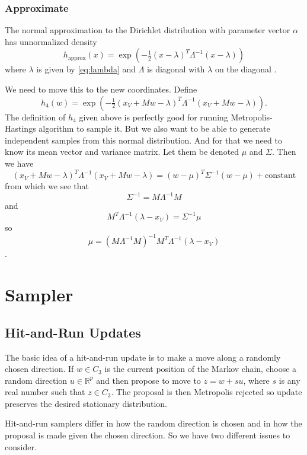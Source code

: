 \documentclass[11pt]{article}
\newcommand{\real}{\mathbb{R}}
\begin{document}
\subsubsection{Approximate}

The normal approximation to the Dirichlet distribution with
parameter vector $\alpha$ has unnormalized density
$$
   h_{\text{approx}}(x)
   =
   \exp\left(- \tfrac{1}{2} (x - \lambda)^T \Lambda^{- 1} (x - \lambda) \right)
$$
where $\lambda$ is given by \eqref{eq:lambda} and $\Lambda$ is diagonal
with $\lambda$ on the diagonal \citep[Theorem~4.2]{geyer-meeden}.

We need to move this to the new coordinates.  Define
$$
   h_4(w)
   =
   \exp\left(- \tfrac{1}{2} (x_V + M w - \lambda)^T
   \Lambda^{- 1} (x_V + M w - \lambda) \right).
$$
The definition of $h_4$ given above is perfectly good for running
Metropolis-Hastings algorithm to sample it.  But we also want to
be able to generate independent samples from this normal distribution.
And for that we need to know its mean vector and variance matrix.
Let them be denoted $\mu$ and $\Sigma$.  Then we have
$$
   (x_V + M w - \lambda)^T \Lambda^{- 1} (x_V + M w - \lambda)
   =
   (w - \mu)^T \Sigma^{- 1} (w - \mu) + \text{constant}
$$
from which we see that
$$
   \Sigma^{- 1} = M \Lambda^{- 1} M
$$
and
$$
   M^T \Lambda^{- 1} (\lambda - x_V) = \Sigma^{- 1} \mu
$$
so
$$
   \mu = \left( M \Lambda^{- 1} M \right)^{- 1}
   M^T \Lambda^{- 1} (\lambda - x_V)
$$
\citep[compare equation (25) in][]{geyer-meeden}.

\section{Sampler}

\subsection{Hit-and-Run Updates}

The basic idea of a hit-and-run update is to make a move along a randomly
chosen direction.    If $w \in C_3$ is the current position of the Markov
chain, choose a random direction $u \in \real^p$ and then propose to move
to $z = w + s u$, where $s$ is any real number such that $z \in C_3$.
The proposal is then Metropolis rejected so update preserves the desired
stationary distribution.

Hit-and-run samplers differ in how the random direction is chosen and in
how the proposal is made given the chosen direction.  So we have two
different issues to consider.
\end{document}
